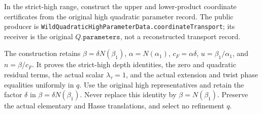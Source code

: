 \begin{theorem}
\label{mod:cases-wildquadratic-highcoordinatetransport}
In the strict-high range, construct the upper and lower-product coordinate
certificates from the original high quadratic parameter record.  The public
producer is \texttt{WildQuadraticHighParameterData.coordinateTransport}; its
receiver is the original \(Q.\texttt{parameters}\), not a reconstructed
transport record.

The construction retains
\(\beta=\delta N(\beta_1)\), \(\alpha=N(\alpha_1)\),
\(c_F=\alpha\delta\), \(u=\beta_1/\alpha_1\), and
\(n=\beta/c_F\).  It proves the strict-high depth identities, the zero and
quadratic residual terms, the actual scalar \(\lambda_\tau=1\), and the
actual extension and twist phase equalities uniformly in \(q\).
\leanok
{}
\FormalizationContract
Use the original high representatives and retain the factor \(\delta\) in
\(\beta=\delta N(\beta_1)\).  Never replace this identity by
\(\beta=N(\beta_1)\).  Preserve the actual elementary and Hasse translations,
and select no refinement \(q\).
\end{theorem}

